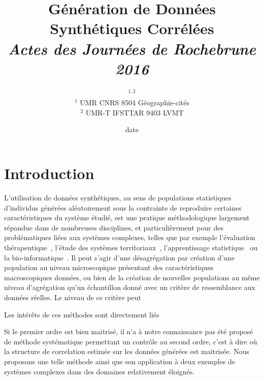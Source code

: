


\title{Génération de Données Synthétiques Corrélées\\\medskip
\textit{Actes des Journées de Rochebrune 2016}
}
\author{$^{1,2}$\\
$^{1}$ UMR CNRS 8504 Géographie-cités\\
$^{2}$ UMR-T IFSTTAR 9403 LVMT
}
\date{date}


\maketitle

\justify


\begin{abstract}
\end{abstract}



\section{Introduction}

L'utilisation de données synthétiques, au sens de populations statistiques d'individus générées aléatoirement sous la contrainte de reproduire certaines caractéristiques du système étudié, est une pratique méthodologique largement répandue dans de nombreuses disciplines, et particulièrement pour des problématiques liées aux systèmes complexes, telles que par exemple l'évaluation thérapeutique~\cite{abadie2010synthetic}, l'étude des systèmes territoriaux~\cite{moeckel2003creating,pritchard2009advances}, l'apprentissage statistique~\cite{bolon2013review} ou la bio-informatique~\cite{van2006syntren}. Il peut s'agir d'une désagrégation par création d'une population au niveau microscopique présentant des caractéristiques macroscopiques données, ou bien de la création de nouvelles populations au même niveau d'agrégation qu'un échantillon donné avec un critère de ressemblance aux données réelles. Le niveau de ce critère peut %

Les intérêts de ces méthodes sont directement liés 



Si le premier ordre est bien maitrisé, il n'a à notre connaissance pas été proposé de méthode systématique permettant un contrôle au second ordre,%
c'est à dire où la structure de correlation estimée sur les données générées est maitrisée. Nous proposons une telle méthode ainsi que son application à deux exemples de systèmes complexes dans des domaines relativement éloignés.

